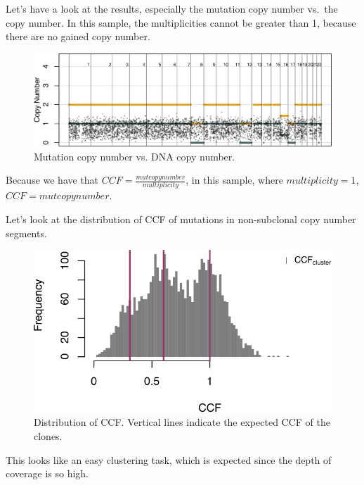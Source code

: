 \documentclass[]{article}
\begin{document}
Let's have a look at the results, especially the mutation copy number
vs.~the copy number. In this sample, the multiplicities cannot be
greater than 1, because there are no gained copy number.

\begin{figure}

{\centering \includegraphics{src_guide_files/figure-latex/fig7-1} 

}

\caption{\label{fig7} Mutation copy number vs. DNA copy number.}\label{fig:fig7}
\end{figure}

Because we have that \(CCF=\frac{mutcopynumber}{multiplicity}\), in this
sample, where \(multiplicity=1\), \(CCF=mutcopynumber\).

Let's look at the distribution of CCF of mutations in non-subclonal copy
number segments.

\begin{figure}

{\centering \includegraphics{src_guide_files/figure-latex/fig8-1} 

}

\caption{\label{fig8} Distribution of CCF. Vertical lines indicate the expected CCF of the clones.}\label{fig:fig8}
\end{figure}

This looks like an easy clustering task, which is expected since the
depth of coverage is so high.
\end{document}

